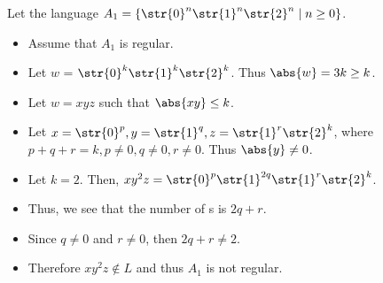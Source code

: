 Let the language $A_1 = \{\str{0}^n\str{1}^n\str{2}^n \mid n \geq 0\}$.
\begin{itemize}
	\item Assume that $A_1$ is regular.
	\item Let $w$ = $\str{0}^k\str{1}^k\str{2}^k$. Thus $\abs{w} = 3k \geq k$.
	\item Let $w = xyz$ such that $\abs{xy} \leq k$.
	\item Let $x = \str{0}^p, y = \str{1}^q, z = \str{1}^r\str{2}^k$, where $p+q+r = k, p \neq 0, q \neq 0, r \neq 0$. Thus $\abs{y} \neq 0$.
	\item Let $k=2$. Then, $xy^2z = \str{0}^p\str{1}^{2q}\str{1}^r\str{2}^k$.
	\item Thus, we see that the number of s is $2q + r$.
	\item Since $q \neq 0$ and $r \neq 0$, then $2q + r \neq 2$.
	\item Therefore $xy^2z \notin L$ and thus $A_1$ is not regular.
\end{itemize}